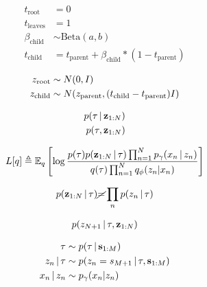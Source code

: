 \begin{align*}
    t_{\textrm{root}} &= 0 \\
    t_{\textrm{leaves}} &= 1 \\
    \beta_{\textrm{child}} &\sim \textrm{Beta}(a, b)\\
    t_{\textrm{child}} &= t_{\textrm{parent}} + \beta_{\textrm{child}} * (1 - t_{\textrm{parent}})
\end{align*}

\begin{align*}
    z_{\textrm{root}} &\sim N(0, I) \\
    z_{\textrm{child}} &\sim N(z_{\textrm{parent}}, (t_{\textrm{child}} - t_{\textrm{parent}}) I)
\end{align*}

\begin{align*}
    p(\tau \,|\, \mathbf{z}_{1:N}) \\
    p(\tau, \mathbf{z}_{1:N})
\end{align*}

\begin{align*}
  L[q] \triangleq \mathbb{E}_q\left[\log \frac{p(\tau)p(\mathbf{z}_{1:N} \,|\, \tau)\prod_{n = 1}^N p_\gamma(x_n \,|\, z_n)}
  {q(\tau)\prod_{n = 1}^N q_\phi(z_n | x_n)}\right]
\end{align*}

\begin{align*}
  p(\mathbf{z}_{1:N} \,|\, \tau) \cancel{=} \prod_n p(z_n \,|\, \tau)
\end{align*}

\begin{align*}
    p(z_{N + 1} \,|\, \tau, \mathbf{z}_{1:N})
\end{align*}

\begin{align*}
  \tau &\sim p(\tau \,|\, \textbf{s}_{1:M}) \\
  z_n \,|\, \tau &\sim p(z_n = s_{M + 1} \,|\, \tau, \textbf{s}_{1:M}) \\
  x_n \,|\, z_n &\sim p_\gamma(x_n | z_n)
\end{align*}
\fi

